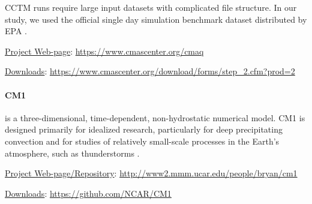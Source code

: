 CCTM runs require large input datasets with complicated file structure.
In our study, we used the official single day simulation benchmark dataset distributed by EPA \cite{EPA}.

\underline{Project Web-page}: \url{https://www.cmascenter.org/cmaq}

\underline{Downloads}: \url{https://www.cmascenter.org/download/forms/step_2.cfm?prod=2}

\iffalse
\underline{Use case description}

The following libraries have to be installed prior to building CCTM: \textit{NetCDF, NetCDF Fortran, IOAPI}. When installed, the following scripts could have been initiated to finish the installation and run the application itself: \textit{config\_cmaq.csh, bldit\_project.csh, bldit\_cctm.csh, run\_cct.csh}.
Benchmark data have been downloaded based on the information provided by EPA for a single day \cite{EPA}.
\fi

\paragraph{CM1} is a three-dimensional, time-dependent, non-hydrostatic numerical model. %
CM1 is designed primarily for idealized research, particularly for deep precipitating convection and for studies of relatively small-scale processes in the Earth's atmosphere, such as thunderstorms \cite{CM1}.

\iffalse
CM1 is also designed for distributed-memory computing systems. In CM1 there are three models of parallelization. Shared memory parallelization with OpenMP, distributed memory using MPI and mix of both of them - hybrid OpenMP/MPI.
\fi

\underline{Project Web-page/Repository}: \url{http://www2.mmm.ucar.edu/people/bryan/cm1}

\underline{Downloads}: \url{https://github.com/NCAR/CM1}

\iffalse
\underline{Use case description}

CM1 use case contains the following steps: CM1 software download and unpack  \cite{CM1DATA}, compilation and build. When successfully compiled, a \textit{cm1.exe} binary file is created under \textit{cm1r19/run} directory. \textit{cm1r19/ run/ namelist.input} configuration file was used with appropriate \textit{nodex, nodey} and \textit{ppnode} values to let the simulation start on the given number of processors (NP). The simulation is started by calling mpirun: \textit{mpirun -np \$NP ./cm1.exe}
\fi

